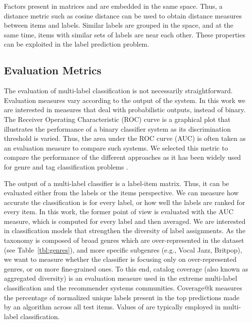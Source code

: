 \documentclass{article}
\begin{document}
Factors present in matrices  and  are embedded in the same space. Thus, a distance metric such as cosine distance can be used to obtain distance measures between items and labels. Similar labels are grouped in the space, and at the same time, items with similar sets of labels are near each other. These properties can be exploited in the label prediction problem.


\subsection{Evaluation Metrics}\label{sec:metrics}

The evaluation of multi-label classification is not necessarily straightforward. 
Evaluation measures vary according to the output of the system. 
In this work we are interested in measures that deal with probabilistic outputs, instead of binary. 
The Receiver Operating Characteristic (ROC) curve is a graphical plot that illustrates the performance of a binary classifier system as its discrimination threshold is varied. 
Thus, the area under the ROC curve (AUC) is often taken as an evaluation measure to compare such systems. 
We selected this metric to compare the performance of the different approaches as it has been widely used for genre and tag classification problems \cite{Choi2016,dieleman2014end}. 


The output of a multi-label classifier is a label-item matrix. 
Thus, it can be evaluated either from the labels or the items perspective. 
We can measure how accurate the classification is for every label, or how well the labels are ranked for every item. 
In this work, the former point of view is evaluated with the AUC measure, which is computed for every label and then averaged. 
We are interested in classification models that strengthen the diversity of label assignments. 
As the taxonomy is composed of broad genres which are over-represented in the dataset (see Table~\ref{tbl:genres}), and more specific subgenres (e.g., Vocal Jazz, Britpop), we want to measure whether the classifier is focusing only on over-represented genres, or on more fine-grained ones.
To this end, catalog coverage (also known as aggregated diversity) is an evaluation measure used in the extreme multi-label classification \cite{jain2016extreme} and the recommender systems \cite{oramas2016sound} communities. Coverage@k measures the percentage of normalized unique labels present in the top  predictions made by an algorithm across all test items. Values of  are typically employed in multi-label classification.
\end{document}
